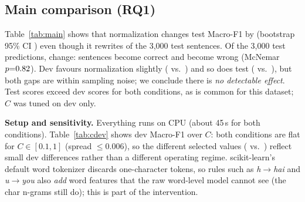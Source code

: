 \documentclass[10pt,twocolumn,letterpaper]{article}
\begin{document}
\subsection{Main comparison (RQ1)}
\begin{table}[t]\centering\footnotesize\setlength{\tabcolsep}{4pt}

\caption{Raw vs.\ normalized text (word + char features). $C$ chosen on dev.}\label{tab:main}
\end{table}
Table~\ref{tab:main} shows that normalization changes test Macro-F1 by \FDiff{} (bootstrap 95\% CI \FDiffCI) even though it rewrites \ChangedTest{} of the 3{,}000 test sentences. Of the 3{,}000 test predictions, \PredChanged{} change: \FOnlyNorm{} sentences become correct and \FOnlyRaw{} become wrong (McNemar $p{=}0.82$). Dev favours normalization slightly (\RawDevF{} vs.\ \NormDevF) and so does test (\RawTestF{} vs.\ \NormTestF), but both gaps are within sampling noise; we conclude there is \emph{no detectable effect}. Test scores exceed dev scores for both conditions, as is common for this dataset; $C$ was tuned on dev only.

\textbf{Setup and sensitivity.} Everything runs on CPU (about 45\,s for both conditions). Table~\ref{tab:cdev} shows dev Macro-F1 over $C$: both conditions are flat for $C\in[0.1,1]$ (spread $\le$0.006), so the different selected values (\RawC{} vs.\ \NormC) reflect small dev differences rather than a different operating regime. scikit-learn's default word tokenizer discards one-character tokens, so rules such as \emph{h}$\to$\emph{hai} and \emph{u}$\to$\emph{you} also \emph{add} word features that the raw word-level model cannot see (the char n-grams still do); this is part of the intervention.
\begin{table}[t]\centering\footnotesize\setlength{\tabcolsep}{4pt}

\caption{Dev Macro-F1 for each inverse regularisation strength $C$.}\label{tab:cdev}
\end{table}
\end{document}
